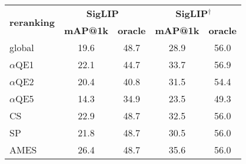\small
\begin{tabular}{lcccc}
\toprule
\multirow{2}{*}{\textbf{reranking}}  & \multicolumn{2}{c}{\textbf{SigLIP}~\cite{siglip}} & \multicolumn{2}{c}{\textbf{SigLIP$^\dagger$}~\cite{siglip}} \\ \cmidrule(lr){2-3} \cmidrule(lr){4-5}
 & \textbf{mAP@1k} & \textbf{oracle}  & \textbf{mAP@1k} & \textbf{oracle} \\ 
\midrule
global                           & 19.6 & 48.7 & 28.9 & 56.0 \\ 
\midrule
$\alpha$QE1~\cite{cps+07,rtc19}  & 22.1 & 44.7 & 33.7 & 56.9 \\
$\alpha$QE2~\cite{cps+07,rtc19}  & 20.4 & 40.8 & 31.5 & 54.4 \\
$\alpha$QE5~\cite{cps+07,rtc19}  & 14.3 & 34.9 & 23.5 & 49.3 \\ 
\midrule
CS~\cite{rsa+14}                 & 22.9 & 48.7 & 32.5 & 56.0 \\
SP~\cite{pci+07}                 & 21.8 & 48.7 & 30.5 & 56.0 \\
AMES~\cite{ski+24}               & 26.4 & 48.7 & 35.6 & 56.0 \\
\bottomrule
\end{tabular}